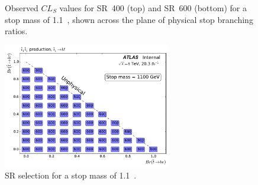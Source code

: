 \begin{figure}[ht]
  \centering
  \caption{
    Observed
    $CL_S$ values for SR~400 (top) and SR~600 (bottom) for a stop mass of
    1.1~\TeV,
    shown across the plane of physical stop branching ratios.
  }
\end{figure}

\begin{figure}[ht]
  \centering
  \includegraphics[width=0.65\textwidth]
    {figs/blstop/region_selection/region_choice_vs_br_m_1100.pdf}
  \caption{
    SR selection for a stop mass of 1.1~\TeV.
  }
\end{figure}

